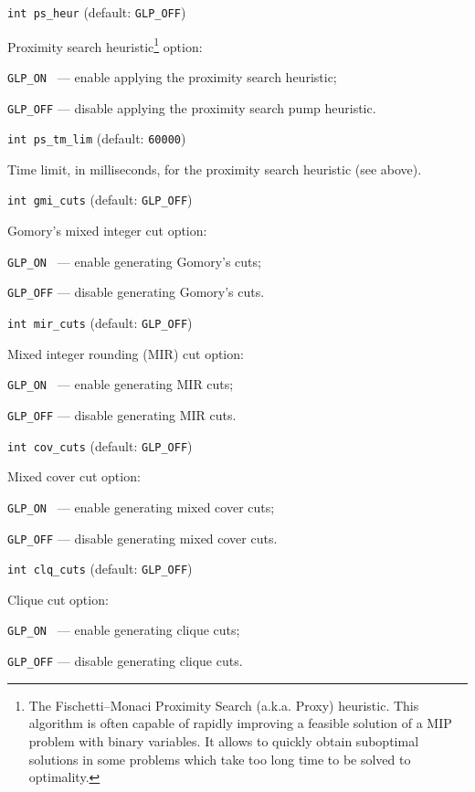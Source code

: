 \bigskip

{\tt int ps\_heur} (default: {\tt GLP\_OFF})

Proximity search heuristic\footnote{The Fischetti--Monaci Proximity
Search (a.k.a. Proxy) heuristic. This algorithm is often capable of
rapidly improving a feasible solution of a MIP problem with binary
variables. It allows to quickly obtain suboptimal solutions in some
problems which take too long time to be solved to optimality.} option:

\verb|GLP_ON | --- enable applying the proximity search heuristic;

\verb|GLP_OFF| --- disable applying the proximity search pump heuristic.

\bigskip

{\tt int ps\_tm\_lim} (default: {\tt 60000})

Time limit, in milliseconds, for the proximity search heuristic (see
above).

\bigskip

{\tt int gmi\_cuts} (default: {\tt GLP\_OFF})

Gomory's mixed integer cut option:

\verb|GLP_ON | --- enable generating Gomory's cuts;

\verb|GLP_OFF| --- disable generating Gomory's cuts.

\bigskip

{\tt int mir\_cuts} (default: {\tt GLP\_OFF})

Mixed integer rounding (MIR) cut option:

\verb|GLP_ON | --- enable generating MIR cuts;

\verb|GLP_OFF| --- disable generating MIR cuts.

\bigskip

{\tt int cov\_cuts} (default: {\tt GLP\_OFF})

Mixed cover cut option:

\verb|GLP_ON | --- enable generating mixed cover cuts;

\verb|GLP_OFF| --- disable generating mixed cover cuts.

\bigskip

{\tt int clq\_cuts} (default: {\tt GLP\_OFF})

Clique cut option:

\verb|GLP_ON | --- enable generating clique cuts;

\verb|GLP_OFF| --- disable generating clique cuts.

\newpage

